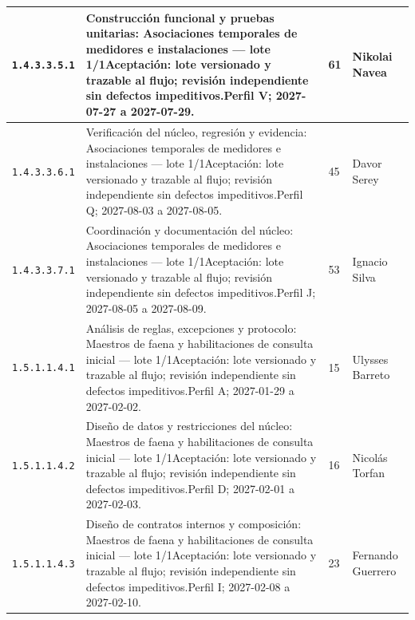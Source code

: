 \begin{longtable}{L{29mm}L{80mm}R{12mm}L{28mm}}
\texttt{1.\allowbreak{}4.\allowbreak{}3.\allowbreak{}3.\allowbreak{}5.\allowbreak{}1} & Construcción funcional y pruebas unitarias: Asociaciones temporales de medidores e instalaciones — lote 1/1\newline Aceptación: lote versionado y trazable al flujo; revisión independiente sin defectos impeditivos.\newline Perfil V; 2027-07-27 a 2027-07-29. & 61 & Nikolai Navea\\\hline
\texttt{1.\allowbreak{}4.\allowbreak{}3.\allowbreak{}3.\allowbreak{}6.\allowbreak{}1} & Verificación del núcleo, regresión y evidencia: Asociaciones temporales de medidores e instalaciones — lote 1/1\newline Aceptación: lote versionado y trazable al flujo; revisión independiente sin defectos impeditivos.\newline Perfil Q; 2027-08-03 a 2027-08-05. & 45 & Davor Serey\\\hline
\texttt{1.\allowbreak{}4.\allowbreak{}3.\allowbreak{}3.\allowbreak{}7.\allowbreak{}1} & Coordinación y documentación del núcleo: Asociaciones temporales de medidores e instalaciones — lote 1/1\newline Aceptación: lote versionado y trazable al flujo; revisión independiente sin defectos impeditivos.\newline Perfil J; 2027-08-05 a 2027-08-09. & 53 & Ignacio Silva\\\hline
\texttt{1.\allowbreak{}5.\allowbreak{}1.\allowbreak{}1.\allowbreak{}4.\allowbreak{}1} & Análisis de reglas, excepciones y protocolo: Maestros de faena y habilitaciones de consulta inicial — lote 1/1\newline Aceptación: lote versionado y trazable al flujo; revisión independiente sin defectos impeditivos.\newline Perfil A; 2027-01-29 a 2027-02-02. & 15 & Ulysses Barreto\\\hline
\texttt{1.\allowbreak{}5.\allowbreak{}1.\allowbreak{}1.\allowbreak{}4.\allowbreak{}2} & Diseño de datos y restricciones del núcleo: Maestros de faena y habilitaciones de consulta inicial — lote 1/1\newline Aceptación: lote versionado y trazable al flujo; revisión independiente sin defectos impeditivos.\newline Perfil D; 2027-02-01 a 2027-02-03. & 16 & Nicolás Torfan\\\hline
\texttt{1.\allowbreak{}5.\allowbreak{}1.\allowbreak{}1.\allowbreak{}4.\allowbreak{}3} & Diseño de contratos internos y composición: Maestros de faena y habilitaciones de consulta inicial — lote 1/1\newline Aceptación: lote versionado y trazable al flujo; revisión independiente sin defectos impeditivos.\newline Perfil I; 2027-02-08 a 2027-02-10. & 23 & Fernando Guerrero\\\hline

\end{longtable}
